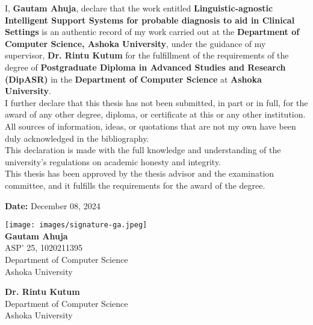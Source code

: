 I, \textbf{Gautam Ahuja}, declare that the work entitled \textbf{Linguistic-agnostic Intelligent Support Systems for probable diagnosis to aid in Clinical Settings} is an authentic record of my work carried out at the \textbf{Department of Computer Science, Ashoka University}, under the guidance of my supervisor, \textbf{Dr. Rintu Kutum} for the fulfillment of the requirements of the degree of \textbf{Postgraduate Diploma in Advanced Studies and Research (DipASR)} in the \textbf{Department of Computer Science} at \textbf{Ashoka University}. \\%

\noindent I further declare that this thesis has not been submitted, in part or in full, for the award of any other degree, diploma, or certificate at this or any other institution. All sources of information, ideas, or quotations that are not my own have been duly acknowledged in the bibliography. \\ %


\noindent This declaration is made with the full knowledge and understanding of the university's regulations on academic honesty and integrity. \\%


\noindent This thesis has been approved by the thesis advisor and the examination committee, and it fulfills the requirements for the award of the degree.\\%

\begin{flushleft}
\textbf{Date:} December 08, 2024
\end{flushleft}

\begin{flushright}
\texttt{[image: images/signature-ga.jpeg]}\\
\textbf{Gautam Ahuja}\\
ASP' 25, 1020211395\\
Department of Computer Science\\
Ashoka University\\
\end{flushright}

\vspace{1.25cm}
\begin{flushright}
\textbf{Dr. Rintu Kutum}\\
Department of Computer Science\\
Ashoka University\\
\end{flushright}